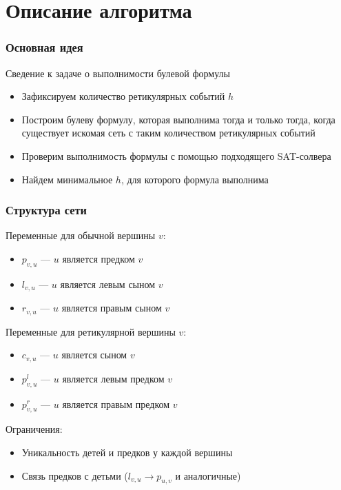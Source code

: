 \documentclass[hyperref={unicode}]{beamer}
\begin{document}
\section{Описание алгоритма}

\begin{frame}
\frametitle{Основная идея}

Сведение к задаче о выполнимости булевой формулы

\begin{itemize}
	\item Зафиксируем количество ретикулярных событий $h$
	\item Построим булеву формулу, которая выполнима тогда и только тогда, когда существует искомая сеть с таким количеством ретикулярных событий
	\item Проверим выполнимость формулы с помощью подходящего SAT-солвера
	\item Найдем минимальное $h$, для которого формула выполнима
\end{itemize}

\end{frame}

\begin{frame}
\frametitle{Структура сети}

Переменные для обычной вершины $v$:

\begin{itemize}
	\item $p_{v, u}$ --- $u$ является предком $v$
	\item $l_{v, u}$ --- $u$ является левым сыном $v$
	\item $r_{v, u}$ --- $u$ является правым сыном $v$
\end{itemize}

Переменные для ретикулярной вершины $v$:

\begin{itemize}
	\item $c_{v, u}$ --- $u$ является сыном $v$
	\item $p^l_{v, u}$ --- $u$ является левым предком $v$
	\item $p^r_{v, u}$ --- $u$ является правым предком $v$
\end{itemize}

Ограничения:
\begin{itemize}
	\item Уникальность детей и предков у каждой вершины
	\item Связь предков с детьми ($l_{v, u} \rightarrow p_{u, v}$ и аналогичные)
\end{itemize}

\end{frame}
\end{document}
